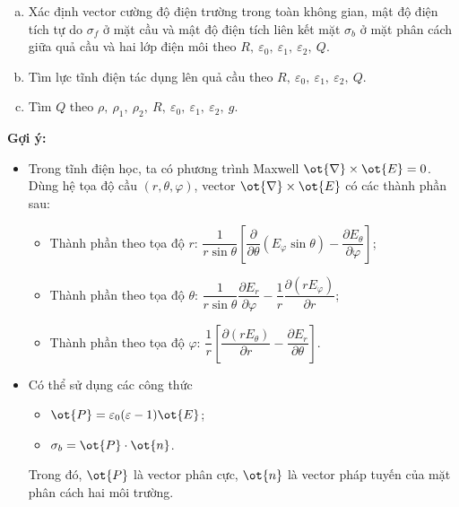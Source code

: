\begin{vd}
\begin{enumerate}[1)]
\begin{center}
\begin{tikzpicture}[x=0.75pt,y=0.75pt,yscale=-1,xscale=1]
\end{tikzpicture}
    \end{center}
    \begin{enumerate}[a)]
        \item Xác định vector cường độ điện trường trong toàn không gian, mật độ điện tích tự do ${{\sigma}_{f}}$ ở mặt cầu và mật độ điện tích liên kết mặt ${{\sigma }_{b}}$ ở mặt phân cách giữa quả cầu và hai lớp điện môi theo $R,~{{\varepsilon }_{0}},~{{\varepsilon }_{1}},~{{\varepsilon }_{2}},~Q$.
        \item Tìm lực tĩnh điện tác dụng lên quả cầu theo $R,~{{\varepsilon }_{0}},~{{\varepsilon }_{1}},~{{\varepsilon }_{2}},~Q.$
        \item Tìm $Q$ theo $\rho ,~{{\rho }_{1}},~{{\rho }_{2}},~R,~{{\varepsilon }_{0}},~{{\varepsilon }_{1}},~{{\varepsilon }_{2}},~g.$
    \end{enumerate}
\end{enumerate}
\textbf{Gợi ý:}
\begin{itemize}
    \item Trong tĩnh điện học, ta có phương trình Maxwell $\ot{\nabla }\times \ot{E}=0$. Dùng hệ tọa độ cầu $(r,\theta ,\varphi )$, vector $\ot{\nabla }\times \ot{E}$ có các thành phần sau: 
    \begin{itemize}
        \item Thành phần theo tọa độ $r$: $\dfrac{1}{r\sin \theta }\left[ \dfrac{\partial }{\partial \theta }\left( {{E}_{\varphi }}\sin \theta  \right)-\dfrac{\partial {{E}_{\theta }}}{\partial \varphi } \right]$;
        \item Thành phần theo tọa độ $\theta $: $\dfrac{1}{r\sin \theta }\dfrac{\partial {{E}_{r}}}{\partial \varphi }-\dfrac{1}{r}\dfrac{\partial \left( r{{E}_{\varphi }} \right)}{\partial r}$;
        \item Thành phần theo tọa độ $\varphi $: $\dfrac{1}{r}\left[ \dfrac{\partial \left( r{{E}_{\theta }} \right)}{\partial r}-\dfrac{\partial {{E}_{r}}}{\partial \theta } \right]$.
    \end{itemize}
    \item Có thể sử dụng các công thức
    \begin{itemize}
        \item $\ot{P}={{\varepsilon }_{0}}(\varepsilon -1)\ot{E}$;
        \item ${{\sigma }_{b}}=\ot{P}\cdot\ot{n}$.
    \end{itemize} 
    Trong đó, $\ot{P}$ là vector phân cực, $\ot{n}$ là vector pháp tuyến của mặt phân cách hai môi trường.
\end{itemize}
\end{vd}
